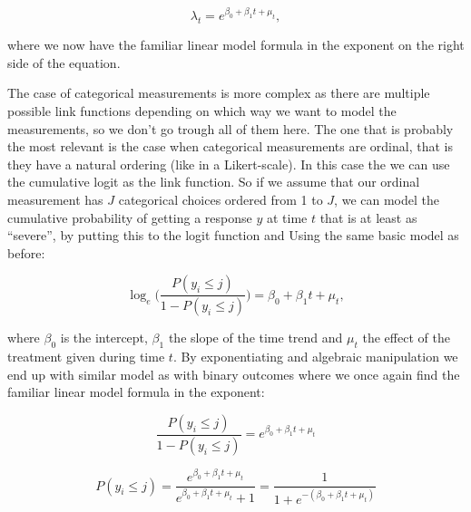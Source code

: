 \documentclass[12pt,a4paper,leqno]{report}
\theoremstyle{plain}
\theoremstyle{definition}
\theoremstyle{remark}
\begin{document}
\begin{def}\label{oneerror}
    \begin{equation}
        \lambda_t=e^{\beta_0 + \beta_1 t + \mu_t},
    \end{equation}
\end{def}where we now have the familiar linear model formula in the exponent on the right
side of the equation.

The case of categorical measurements is more complex as there are multiple possible link
functions depending on which way we want to model the measurements, so we don't go trough
all of them here. The one that is probably the most relevant is the case when categorical
measurements are ordinal, that is they have a natural ordering (like in a Likert-scale).
In this case the we can use the cumulative logit as the link function. So if we assume
that our ordinal measurement has \(J\) categorical choices ordered from 1 to \(J\), we
can model the cumulative probability of getting a response \(y\) at time \(t\) that is at
least as ``severe'', by putting this to the logit function and Using the same basic model
as before:

\begin{def}\label{oneerror}
    \begin{equation}
        \log_e\bigg({\frac{P(y_i \leq j)}{1 - P(y_i \leq j)}}\bigg)=\beta_0 + \beta_1 t + \mu_t,
    \end{equation}
\end{def}where \(\beta_0\) is the intercept, \(\beta_1\) the slope of the time trend and
\(\mu_t\) the effect of the treatment given during time \(t\). By exponentiating and
algebraic manipulation we end up with similar model as with binary outcomes where we once
again find the familiar linear model formula in the exponent:

\begin{def}\label{}
    \begin{equation}\label{ord_exponentiating}
        \frac{P(y_i \leq j)}{1 - P(y_i \leq j)}=e^{\beta_0 + \beta_1 t + \mu_t}
    \end{equation}
\end{def}

\begin{def}\label{}
    \begin{equation}\label{ord_algmanipulation}
        P(y_i \leq j)=\frac{e^{\beta_0 + \beta_1 t + \mu_t}}{e^{\beta_0 + \beta_1 t + \mu_t}+1}=\frac{1}{1+e^{-(\beta_0 + \beta_1 t + \mu_t)}}
    \end{equation}
\end{def}
\end{document}
